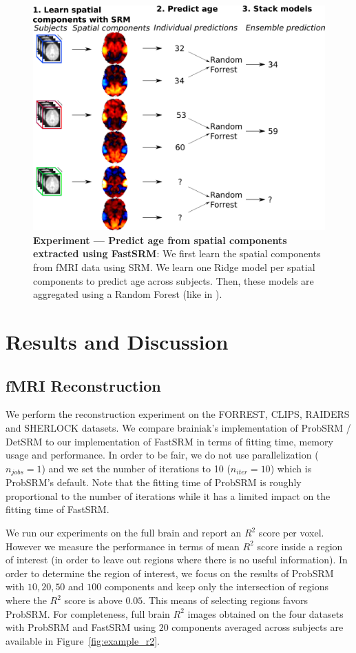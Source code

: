 \begin{figure}
\centering
\includegraphics[scale=0.35]{figures/srm/conceptual_figure72.png}
\caption{\textbf{Experiment — Predict age from spatial components extracted using FastSRM}: We first learn the spatial components from fMRI data using SRM. We learn one Ridge model per spatial components to predict age across subjects. Then, these models are aggregated using a Random Forest (like in \cite{rahim2017joint}).} 
\label{fig:experiment_age_prediction}
\end{figure}


\section{Results and Discussion}

\subsection{fMRI Reconstruction}
We perform the reconstruction experiment on the FORREST, CLIPS, RAIDERS and SHERLOCK datasets. We compare brainiak's implementation of ProbSRM / DetSRM to our implementation of FastSRM in terms of fitting time, memory usage and performance. In order to be fair, we do not use parallelization ($n_{jobs} = 1$) and we set the number of iterations to 10 ($n_{iter}=10$) which is ProbSRM's default. Note that the fitting time of ProbSRM is roughly proportional to the number of iterations while it has a limited impact on the fitting time of FastSRM. 


We run our experiments on the full brain and report an $R^2$ score per voxel.
%
However we measure the performance in terms of mean $R^2$ score inside a region of interest (in order to leave out regions where there is no useful information).
%
In order to determine the region of interest, we focus on the results of ProbSRM with $10, 20, 50$ and $100$ components and keep only the intersection of regions where the $R^2$ score is above $0.05$.
%
This means of selecting regions favors ProbSRM. For completeness, full brain $R^2$ images obtained on the four datasets with ProbSRM and FastSRM using $20$ components averaged across subjects are available in Figure~\ref{fig:example_r2}.

